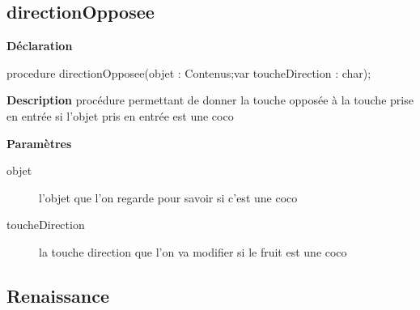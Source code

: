 \documentclass{report}
\newif\ifpdf
\begin{document}
\subsection*{directionOpposee}
\fi
\label{Jouer-directionOpposee}
\begin{list}{}{
\setlength{\itemindent}{0cm}
\setlength{\listparindent}{0cm}
\setlength{\leftmargin}{\evensidemargin}
\addtolength{\leftmargin}{\tmplength}
\settowidth{\labelsep}{X}
\addtolength{\leftmargin}{\labelsep}
\setlength{\labelwidth}{\tmplength}
}
\item[\textbf{Déclaration}\hfill]
\ifpdf
\begin{flushleft}
\fi
\begin{ttfamily}
procedure directionOpposee(objet : Contenus;var toucheDirection : char);\end{ttfamily}

\ifpdf
\end{flushleft}
\fi

\par
\item[\textbf{Description}]
procédure permettant de donner la touche opposée à la touche prise en entrée si l'objet pris en entrée est une coco  \par
\item[\textbf{Paramètres}]
\begin{description}
\item[objet] l'objet que l'on regarde pour savoir si c'est une coco
\item[toucheDirection] la touche direction que l'on va modifier si le fruit est une coco
\end{description}


\end{list}
\ifpdf
\subsection*{\large{\textbf{Renaissance}}\normalsize\hspace{1ex}\hrulefill}
\else
\end{document}
